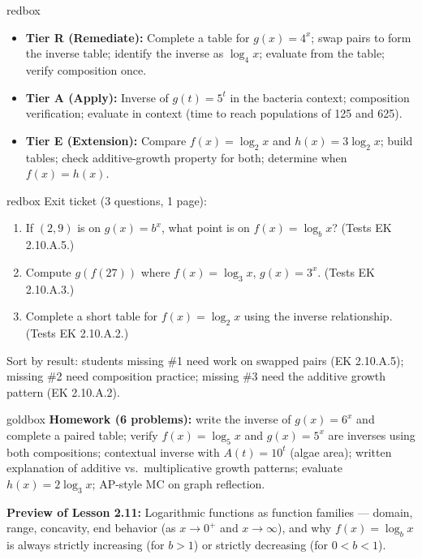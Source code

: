 \documentclass[10pt]{article}
\begin{document}
\begin{skillbox}{redbox}
\begin{itemize}[leftmargin=1.2em,itemsep=2pt,topsep=0pt]
  \item \textbf{Tier R (Remediate):} Complete a table for $g(x) = 4^x$; swap pairs to form the
        inverse table; identify the inverse as $\log_4 x$; evaluate from the table; verify
        composition once.
  \item \textbf{Tier A (Apply):} Inverse of $g(t) = 5^t$ in the bacteria context; composition
        verification; evaluate in context (time to reach populations of 125 and 625).
  \item \textbf{Tier E (Extension):} Compare $f(x) = \log_2 x$ and $h(x) = 3\log_2 x$; build
        tables; check additive-growth property for both; determine when $f(x) = h(x)$.
\end{itemize}
\end{skillbox}

\begin{skillbox}{redbox}
Exit ticket (3 questions, 1 page):
\begin{enumerate}[leftmargin=1.5em,itemsep=2pt,topsep=2pt]
  \item If $(2,9)$ is on $g(x)=b^x$, what point is on $f(x)=\log_b x$? (Tests EK 2.10.A.5.)
  \item Compute $g(f(27))$ where $f(x) = \log_3 x$, $g(x) = 3^x$. (Tests EK 2.10.A.3.)
  \item Complete a short table for $f(x) = \log_2 x$ using the inverse relationship.
        (Tests EK 2.10.A.2.)
\end{enumerate}

Sort by result: students missing \#1 need work on swapped pairs (EK 2.10.A.5);
missing \#2 need composition practice; missing \#3 need the additive growth pattern
(EK 2.10.A.2).
\end{skillbox}

\begin{skillbox}{goldbox}
\textbf{Homework (6 problems):} write the inverse of $g(x) = 6^x$ and complete a paired table;
verify $f(x) = \log_5 x$ and $g(x) = 5^x$ are inverses using both compositions; contextual
inverse with $A(t) = 10^t$ (algae area); written explanation of additive vs.\ multiplicative
growth patterns; evaluate $h(x) = 2\log_3 x$; AP-style MC on graph reflection.

\textbf{Preview of Lesson 2.11:} Logarithmic functions as function families --- domain, range,
concavity, end behavior (as $x \to 0^+$ and $x \to \infty$), and why $f(x) = \log_b x$ is
always strictly increasing (for $b > 1$) or strictly decreasing (for $0 < b < 1$).
\end{skillbox}
\end{document}
